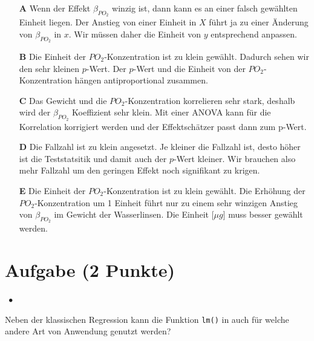 \documentclass[a4paper, 9pt]{scrartcl}\usepackage[]{graphicx}\usepackage[]{xcolor}
\begin{document}
\begin{enumerate}
\item [\textbf{A} \msquare] Wenn der Effekt $\beta_{PO_2}$ winzig ist, dann kann es an einer falsch gewählten Einheit liegen. Der Anstieg von einer Einheit in $X$ führt ja zu einer Änderung von $\beta_{PO_2}$ in $x$. Wir müssen daher die Einheit von $y$ entsprechend anpassen.
\item [\textbf{B} \msquare] Die Einheit der $PO_2$-Konzentration ist zu klein gewählt. Dadurch sehen wir den sehr kleinen $p$-Wert. Der $p$-Wert und die Einheit von der $PO_2$-Konzentration hängen antiproportional zusammen.
\item [\textbf{C} \msquare] Das Gewicht und die $PO_2$-Konzentration korrelieren sehr stark, deshalb wird der $\beta_{PO_2}$ Koeffizient sehr klein. Mit einer ANOVA kann für die Korrelation korrigiert werden und der Effektschätzer passt dann zum p-Wert.
\item [\textbf{D} \msquare] Die Fallzahl ist zu klein angesetzt. Je kleiner die Fallzahl ist, desto höher ist die Teststatsitik und damit auch der $p$-Wert kleiner. Wir brauchen also mehr Fallzahl um den geringen Effekt noch signifikant zu krigen.
\item [\textbf{E} \msquare] Die Einheit der $PO_2$-Konzentration ist zu klein gewählt. Die Erhöhung der $PO_2$-Konzentration um 1 Einheit führt nur zu einem sehr winzigen Anstieg von $\beta_{PO_2}$ im Gewicht der Wasserlinsen. Die Einheit [$\mu g$] muss besser gewählt werden.
\end{enumerate}

\section{Aufgabe \hfill (2 Punkte)}

\ifcollection
\begin{flushright}
\tiny\vspace{-2Ex}
\textbf{\examinhaltstart}
\exammodulestatversuch $\;\bullet$
\exammodulebiostat
\vspace{-1Ex}
\end{flushright}
\fi




Neben der klassischen Regression kann die Funktion \texttt{lm()} in \Rlogo auch für welche andere Art von Anwendung genutzt werden?
\end{document}
